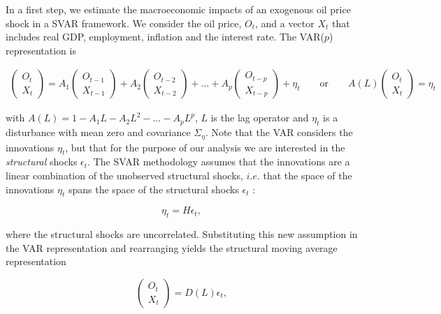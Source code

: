 \documentclass[11pt,a4paper]{article}
\begin{document}

In a first step, we estimate the macroeconomic impacts of an exogenous oil price shock in a SVAR framework. We consider the oil price, $O_t$, and a vector $X_t$ that includes real GDP, employment, inflation and the interest rate. The VAR($p$) representation is 

{\footnotesize
\begin{align*}
 \begin{pmatrix} O_t \\ X_t \end{pmatrix} = 
A_1 \begin{pmatrix} O_{t-1} \\ X_{t-1} \end{pmatrix} +
A_2 \begin{pmatrix} O_{t-2} \\ X_{t-2} \end{pmatrix} +
\ldots +
A_p \begin{pmatrix} O_{t-p} \\ X_{t-p} \end{pmatrix}
+ \eta_t 
\qquad \text{or} \qquad
A(L) \begin{pmatrix} O_t \\ X_t \end{pmatrix} = \eta_t
\end{align*}
}

with $A(L) = 1 - A_1 L - A_2 L^2 -  \ldots - A_p L^p$, $L$ is the lag operator and $\eta_t$ is a disturbance with mean zero and covariance $\Sigma_\eta$. 
Note that the VAR considers the innovations $\eta_t$, but that for the purpose of our analysis we are interested in the \emph{structural} shocks $\epsilon_t$. The SVAR methodology assumes that the innovations are a linear combination of the unobserved structural shocks, $i.e.$ that the space of the innovations $\eta_t$ spans the space of the structural shocks $\epsilon_t$ :  

{\footnotesize \begin{equation}
\eta_t = H\epsilon_t, \label{eq:ino}
\end{equation}}

\noindent
where the structural shocks are uncorrelated.
Substituting this new assumption in the VAR representation and rearranging yields the structural moving average representation 

{\footnotesize $$ \begin{pmatrix} O_t \\ X_t \end{pmatrix}
= D(L) \epsilon_t,$$}
\end{document}
